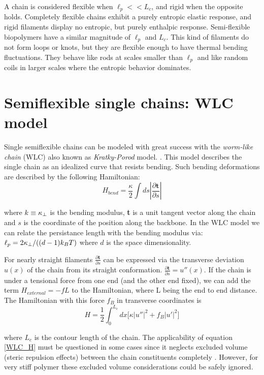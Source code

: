 A chain is considered flexible when $\ell_p<<L_c$, and rigid when the opposite
holds. Completely flexible chains exhibit a purely entropic elastic
response, and rigid filaments display no entropic, but purely enthalpic
response. Semi-flexible biopolymers have a similar magnitude of $\ell_p$ and
$L_c$. This kind of filaments do not form loops or knots, but they are
flexible enough to have thermal bending
fluctuations\citep{storm_nonlinear_2005}. They behave like rods at scales
smaller than $\ell_p$ and like random coils in larger scales where the entropic behavior
dominates.

\section{Semiflexible single chains: WLC model}
Single semiflexible chains can be modeled with great success with the
\emph{worm-like chain} (WLC) also known as \emph{Kratky-Porod} model.
\citep{rubinstein_polymer_2003, schuster_hierarchical_2011}. This model
describes the single chain as an idealized curve that resists bending. Such
bending deformations are described by the following Hamiltonian:
$$H_{bend}=\frac{\kappa}{2} \int ds|\frac{\partial \textbf{t}}{\partial s}|$$

where $k\equiv\kappa_\perp{}$ is the bending modulus, \textbf{t} is a unit tangent
vector along the chain and $s$ is the coordinate of the position along the
backbone. In the WLC model we can relate the persistance length with the bending
modulus via: $\ell_p{}=2\kappa_\perp{}/((d-1)k_B{}T)$ where $d$ is the space
dimensionality.

For nearly straight filaments $\frac{\partial \textbf{t}}{\partial s}$ can be
expressed via the transverse deviation $u(x)$ of the chain from its straight
conformation. $\frac{\partial \textbf{t}}{\partial s}=u''(x)$. If the chain is
under a tensional force from one end (and the other end fixed), we can add the
term $H_{external}=-fL$ to the Hamiltonian, where L being the end to end
distance.
The Hamiltonian with this force $f_B$ in transverse coordinates is
\begin{equation}\label{WLC_H}
H=\frac{1}{2}\int_0^{L_c} dx\Big[\kappa|u''|^2 + f_B|u'|^2\Big]
\end{equation}

where $L_c$ is the contour length of the chain.
The applicability of equation \ref{WLC_H} must be questioned in some cases since
it neglects excluded volume (steric repulsion effects) between the
chain constituents completely \citep{hsu_breakdown_2011}. However, for very stiff
polymer these excluded volume considerations could be safely ignored.

